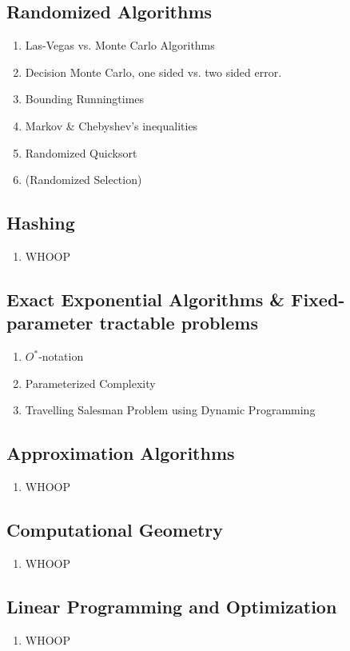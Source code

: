 \subsection{Randomized Algorithms}
\begin{enumerate}
  \item Las-Vegas vs. Monte Carlo Algorithms
  \item Decision Monte Carlo, one sided vs. two sided error.
  \item Bounding Runningtimes
  \item Markov \& Chebyshev's inequalities
  \item Randomized Quicksort
  \item (Randomized Selection)
\end{enumerate}
\newpage

\subsection{Hashing}
\begin{enumerate}
  \item WHOOP
\end{enumerate}
\newpage

\subsection{Exact Exponential Algorithms \& Fixed-parameter tractable problems}
\begin{enumerate}
  \item $O^*$-notation
  \item Parameterized Complexity
  \item Travelling Salesman Problem using Dynamic Programming
\end{enumerate}
\newpage

\subsection{Approximation Algorithms}
\begin{enumerate}
  \item WHOOP
\end{enumerate}
\newpage

\subsection{Computational Geometry}
\begin{enumerate}
  \item WHOOP
\end{enumerate}
\newpage

\subsection{Linear Programming and Optimization}
\begin{enumerate}
  \item WHOOP
\end{enumerate}
\newpage